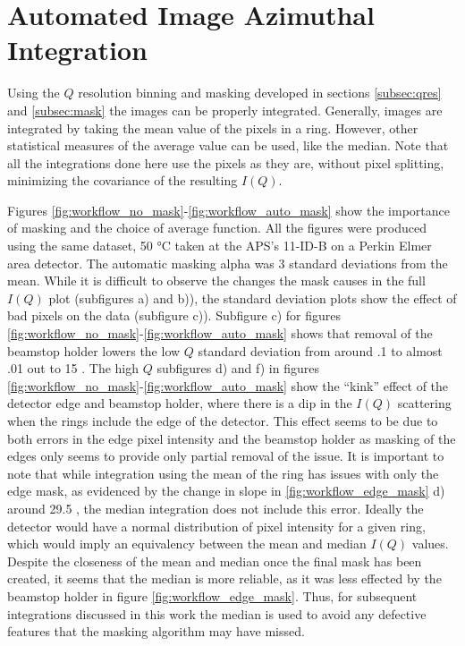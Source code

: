 \section{Automated Image Azimuthal Integration} \label{subsec:int}
Using the $Q$ resolution binning and masking developed in sections \ref{subsec:qres} and \ref{subsec:mask} the images can be properly integrated.
Generally, images are integrated by taking the mean value of the pixels in a ring.
However, other statistical measures of the average value can be used, like the median.
Note that all the integrations done here use the pixels as they are, without pixel splitting, minimizing the covariance of the resulting $I(Q)$.\cite{Yang2014}

Figures \ref{fig:workflow_no_mask}-\ref{fig:workflow_auto_mask} show the importance of masking and the choice of average function.
All the figures were produced using the same dataset, 50 \si{\degree}C  taken at the APS's 11-ID-B on a Perkin Elmer area detector.
The automatic masking alpha was $3$ standard deviations from the mean.
While it is difficult to observe the changes the mask causes in the full $I(Q)$ plot (subfigures a) and b)), the standard deviation plots show the effect of bad pixels on the data (subfigure c)).
Subfigure c) for figures \ref{fig:workflow_no_mask}-\ref{fig:workflow_auto_mask} shows that removal of the beamstop holder lowers the low $Q$ standard deviation from around .1 to almost .01 out to 15 \iA.
The high $Q$ subfigures d) and f) in figures \ref{fig:workflow_no_mask}-\ref{fig:workflow_auto_mask} show the ``kink'' effect of the detector edge and beamstop holder, where there is a dip in the $I(Q)$ scattering when the rings include the edge of the detector.
This effect seems to be due to both errors in the edge pixel intensity and the beamstop holder as masking of the edges only seems to provide only partial removal of the issue.
It is important to note that while integration using the mean of the ring has issues with only the edge mask, as evidenced by the change in slope in \ref{fig:workflow_edge_mask} d) around 29.5 \iA, the median integration does not include this error.
Ideally the detector would have a normal distribution of pixel intensity for a given ring, which would imply an equivalency between the mean and median $I(Q)$ values.
Despite the closeness of the mean and median once the final mask has been created, it seems that the median is more reliable, as it was less effected by the beamstop holder in figure \ref{fig:workflow_edge_mask}.
Thus, for subsequent integrations discussed in this work the median is used to avoid any defective features that the masking algorithm may have missed.

